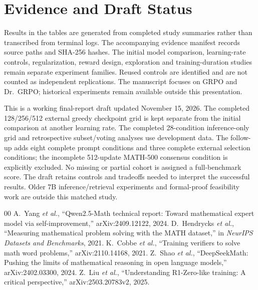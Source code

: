 \documentclass[conference]{IEEEtran}
\begin{document}
\section{Evidence and Draft Status}
Results in the tables are generated from completed study summaries rather than transcribed from terminal logs. The accompanying evidence manifest records source paths and SHA-256 hashes. The initial model comparison, learning-rate controls, regularization, reward design, exploration and training-duration studies remain separate experiment families. Reused controls are identified and are not counted as independent replications. The manuscript focuses on GRPO and Dr.~GRPO; historical experiments remain available outside this presentation.

This is a working final-report draft updated November 15, 2026. The completed 128/256/512 external greedy checkpoint grid is kept separate from the initial comparison at another learning rate. The completed 28-condition inference-only grid and retrospective subset/voting analyses use development data. The follow-up adds eight complete prompt conditions and three complete external selection conditions; the incomplete 512-update MATH-500 consensus condition is explicitly excluded. No missing or partial cohort is assigned a full-benchmark score. The draft retains controls and tradeoffs needed to interpret the successful results. Older 7B inference/retrieval experiments and formal-proof feasibility work are outside this matched study.

\begin{thebibliography}{00}
 A.~Yang \emph{et al.}, ``Qwen2.5-Math technical report: Toward mathematical expert model via self-improvement,'' arXiv:2409.12122, 2024.
 D.~Hendrycks \emph{et al.}, ``Measuring mathematical problem solving with the MATH dataset,'' in \emph{NeurIPS Datasets and Benchmarks}, 2021.
 K.~Cobbe \emph{et al.}, ``Training verifiers to solve math word problems,'' arXiv:2110.14168, 2021.
 Z.~Shao \emph{et al.}, ``DeepSeekMath: Pushing the limits of mathematical reasoning in open language models,'' arXiv:2402.03300, 2024.
 Z.~Liu \emph{et al.}, ``Understanding R1-Zero-like training: A critical perspective,'' arXiv:2503.20783v2, 2025.
\end{thebibliography}
\end{document}
